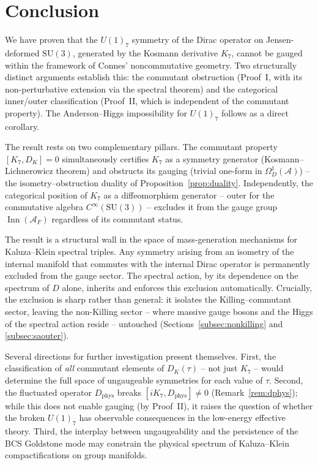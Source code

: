 \documentclass[12pt]{article}
\theoremstyle{definition}
\theoremstyle{remark}
\newcommand{\Alg}{\mathcal{A}}
\newcommand{\Inn}{\operatorname{Inn}}
\begin{document}
\section{Conclusion}
\label{sec:conclusion}

We have proven that the $U(1)_7$ symmetry of the Dirac operator on Jensen-deformed $\mathrm{SU}(3)$, generated by the Kosmann derivative $K_7$, cannot be gauged within the framework of Connes' noncommutative geometry.  Two structurally distinct arguments establish this: the commutant obstruction (Proof~I, with its non-perturbative extension via the spectral theorem) and the categorical inner/outer classification (Proof~II, which is independent of the commutant property).  The Anderson--Higgs impossibility for $U(1)_7$ follows as a direct corollary.

The result rests on two complementary pillars.  The commutant property $[K_7, D_K] = 0$ simultaneously certifies $K_7$ as a symmetry generator (Kosmann--Lichnerowicz theorem) and obstructs its gauging (trivial one-form in $\Omega^1_D(\Alg)$) -- the isometry--obstruction duality of Proposition~\ref{prop:duality}.  Independently, the categorical position of $K_7$ as a diffeomorphism generator -- outer for the commutative algebra $C^\infty(\mathrm{SU}(3))$ -- excludes it from the gauge group $\Inn(\Alg_F)$ regardless of its commutant status.

The result is a structural wall in the space of mass-generation mechanisms for Kaluza--Klein spectral triples.  Any symmetry arising from an isometry of the internal manifold that commutes with the internal Dirac operator is permanently excluded from the gauge sector.  The spectral action, by its dependence on the spectrum of $D$ alone, inherits and enforces this exclusion automatically.  Crucially, the exclusion is sharp rather than general: it isolates the Killing--commutant sector, leaving the non-Killing sector -- where massive gauge bosons and the Higgs of the spectral action reside -- untouched (Sections~\ref{subsec:nonkilling} and \ref{subsec:saouter}).

Several directions for further investigation present themselves.  First, the classification of \emph{all} commutant elements of $D_K(\tau)$ -- not just $K_7$ -- would determine the full space of ungaugeable symmetries for each value of $\tau$.  Second, the fluctuated operator $D_{\mathrm{phys}}$ breaks $[iK_7, D_{\mathrm{phys}}] \neq 0$ (Remark~\ref{rem:dphys}); while this does not enable gauging (by Proof~II), it raises the question of whether the broken $U(1)_7$ has observable consequences in the low-energy effective theory.  Third, the interplay between ungaugeability and the persistence of the BCS Goldstone mode may constrain the physical spectrum of Kaluza--Klein compactifications on group manifolds.
\end{document}
